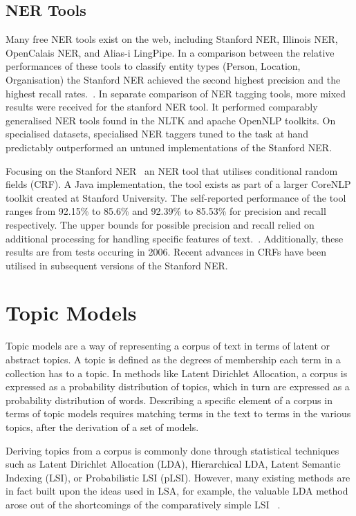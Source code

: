 \documentclass[10pt]{report}
\begin{document}
 \subsection{NER Tools}
 Many free NER tools exist on the web, including Stanford NER, Illinois NER, OpenCalais NER, and Alias-i LingPipe. In a comparison between the relative performances of these tools to classify entity types (Person, Location, Organisation) the Stanford NER achieved the second highest precision and the highest recall rates.~\cite{Atdag2013-qo}. In separate comparison of NER tagging tools, more mixed results were received for the stanford NER tool. It performed comparably generalised NER tools found in the NLTK and apache OpenNLP toolkits. On specialised datasets, specialised NER taggers tuned to the task at hand predictably outperformed an untuned implementations of the Stanford NER.
 
Focusing on the Stanford NER~\cite{Finkel2005-uz} an NER tool that utilises conditional random fields (CRF). A Java implementation, the tool exists as part of a larger CoreNLP toolkit created at Stanford University. The self-reported performance of the tool ranges from 92.15\% to 85.6\% and 92.39\% to 85.53\% for precision and recall respectively. The upper bounds for possible precision and recall relied on additional processing for handling specific features of text.~\cite{noauthor_undated-ik}. Additionally, these results are from tests occuring in 2006. Recent advances in CRFs have been utilised in subsequent versions of the Stanford NER.

\section{Topic Models}
Topic models are a way of representing a corpus of text in terms of latent or abstract topics. A topic is defined as the degrees of membership each term in a collection has to a topic. In methods like Latent Dirichlet Allocation, a corpus is expressed as a probability distribution of topics, which in turn are expressed as a probability distribution of words. Describing a specific element of a corpus in terms of topic models requires matching terms in the text to terms in the various topics, after the derivation of a set of models. 

Deriving topics from a corpus is commonly done through statistical techniques such as  Latent Dirichlet Allocation (LDA), Hierarchical LDA, Latent Semantic Indexing (LSI), or Probabilistic LSI (pLSI). However, many existing methods are in fact built upon the ideas used in LSA, for example, the valuable LDA method arose out of the shortcomings of the comparatively simple LSI ~\cite{Blei2003-dj}.
\end{document}
